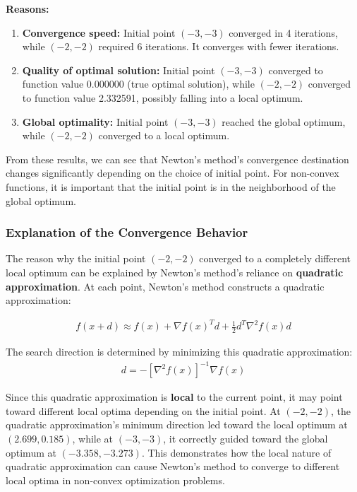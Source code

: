 \documentclass[11pt]{article}
\begin{document}
\begin{enumerate}
\textbf{Reasons:}
\begin{enumerate}
    \item \textbf{Convergence speed:} Initial point $(-3, -3)$ converged in 4 iterations, while $(-2, -2)$ required 6 iterations. It converges with fewer iterations.
    \item \textbf{Quality of optimal solution:} Initial point $(-3, -3)$ converged to function value 0.000000 (true optimal solution), while $(-2, -2)$ converged to function value 2.332591, possibly falling into a local optimum.
    \item \textbf{Global optimality:} Initial point $(-3, -3)$ reached the global optimum, while $(-2, -2)$ converged to a local optimum.
\end{enumerate}

From these results, we can see that Newton's method's convergence destination changes significantly depending on the choice of initial point. For non-convex functions, it is important that the initial point is in the neighborhood of the global optimum.

\subsubsection*{Explanation of the Convergence Behavior}

The reason why the initial point $(-2, -2)$ converged to a completely different local optimum can be explained by Newton's method's reliance on \textbf{quadratic approximation}. At each point, Newton's method constructs a quadratic approximation:

\begin{align}
f(x + d) \approx f(x) + \nabla f(x)^T d + \frac{1}{2}d^T \nabla^2 f(x) d
\end{align}

The search direction is determined by minimizing this quadratic approximation:
\begin{align}
d = -[\nabla^2 f(x)]^{-1} \nabla f(x)
\end{align}

Since this quadratic approximation is \textbf{local} to the current point, it may point toward different local optima depending on the initial point. At $(-2, -2)$, the quadratic approximation's minimum direction led toward the local optimum at $(2.699, 0.185)$, while at $(-3, -3)$, it correctly guided toward the global optimum at $(-3.358, -3.273)$. This demonstrates how the local nature of quadratic approximation can cause Newton's method to converge to different local optima in non-convex optimization problems.


\end{enumerate}
\end{document}
